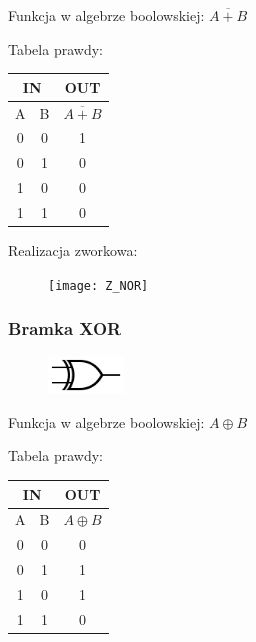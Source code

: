 \documentclass[a4paper,12pt]{article}
\begin{document}
\begin{justify}
Funkcja w algebrze boolowskiej: $\overline{A + B}$

Tabela prawdy:

\begin{table}[h!]
\begin{center}
\begin{scriptsize}
\begin{tabular}{|c|c|c|}
\hline
\multicolumn{2}{|c}{IN} & OUT  \\
\hline
A & B & $\overline{A + B}$ \\
\hline
0 & 0 & 1 \\
0 & 1 & 0 \\
1 & 0 & 0 \\
1 & 1 & 0 \\
\hline
\end{tabular}
\end{scriptsize}
\end{center}
\end{table}

Realizacja zworkowa:

\begin{figure}[h!]
\centering
\texttt{[image: Z\_NOR]}
\end{figure}

\subsubsection{Bramka XOR}

\begin{figure}[h!]
\centering
\includegraphics[width=2cm, height=1cm]{XOR}
\end{figure}

Funkcja w algebrze boolowskiej: $A \oplus B$

Tabela prawdy:

\begin{table}[h!]
\begin{center}
\begin{scriptsize}
\begin{tabular}{|c|c|c|}
\hline
\multicolumn{2}{|c}{IN} & OUT  \\
\hline
A & B & $A \oplus B$ \\
\hline
0 & 0 & 0 \\
0 & 1 & 1 \\
1 & 0 & 1 \\
1 & 1 & 0 \\
\hline
\end{tabular}
\end{scriptsize}
\end{center}
\end{table}


\end{justify}
\end{document}
